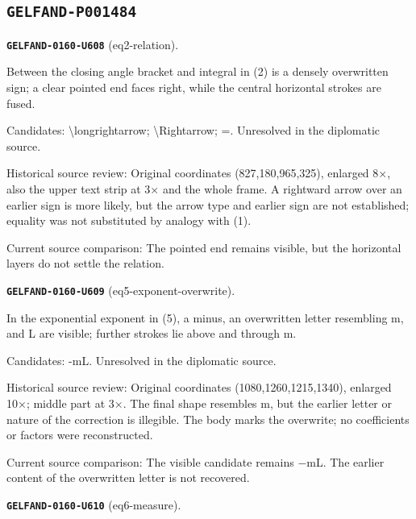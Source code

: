 \subsection*{\texttt{GELFAND-P001484}}
\par\noindent\leavevmode{}\label{GELFAND-0160-U608}\label{GELFAND-P001484:eq2-relation}\textbf{\texttt{GELFAND-0160-U608}} (eq2-relation).\nopagebreak[4]\par
Between the closing angle bracket and integral in (2) is a densely overwritten sign; a clear pointed end faces right, while the central horizontal strokes are fused.\par
Candidates: \textbackslash{}longrightarrow; \textbackslash{}Rightarrow; =. Unresolved in the diplomatic source.\par
Historical source review: Original coordinates (827,180,965,325), enlarged 8×, also the upper text strip at 3× and the whole frame. A rightward arrow over an earlier sign is more likely, but the arrow type and earlier sign are not established; equality was not substituted by analogy with (1).\par
Current source comparison: The pointed end remains visible, but the horizontal layers do not settle the relation.\par\medskip
\par\noindent\leavevmode{}\label{GELFAND-0160-U609}\label{GELFAND-P001484:eq5-exponent-overwrite}\textbf{\texttt{GELFAND-0160-U609}} (eq5-exponent-overwrite).\nopagebreak[4]\par
In the exponential exponent in (5), a minus, an overwritten letter resembling m, and L are visible; further strokes lie above and through m.\par
Candidates: -mL. Unresolved in the diplomatic source.\par
Historical source review: Original coordinates (1080,1260,1215,1340), enlarged 10×; middle part at 3×. The final shape resembles m, but the earlier letter or nature of the correction is illegible. The body marks the overwrite; no coefficients or factors were reconstructed.\par
Current source comparison: The visible candidate remains −mL. The earlier content of the overwritten letter is not recovered.\par\medskip
\par\noindent\leavevmode{}\label{GELFAND-0160-U610}\label{GELFAND-P001484:eq6-measure}\textbf{\texttt{GELFAND-0160-U610}} (eq6-measure).\nopagebreak[4]\par
